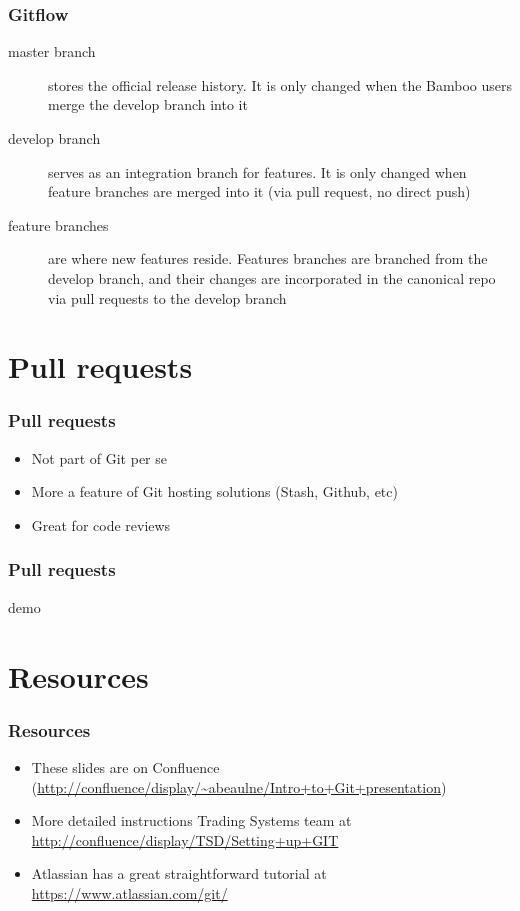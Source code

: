 \documentclass{beamer}
\begin{document}
\begin{frame}
    \frametitle{Gitflow}
    \begin{description}
      \item[master branch] stores the official release history. It is only changed when the Bamboo
          users merge the develop branch into it
      \item[develop branch] serves as an integration branch for features. It is only changed when
          feature branches are merged into it (via pull request, no direct push)
      \item[feature branches] are where new features reside. Features branches are branched from
          the develop branch, and their changes are incorporated in the canonical repo via pull
          requests to the develop branch
    \end{description}
\end{frame}

\section{Pull requests}

\begin{frame}
    \frametitle{Pull requests}
    \begin{itemize}
        \item Not part of Git per se
        \item More a feature of Git hosting solutions (Stash, Github, etc)
        \item Great for code reviews
    \end{itemize}
\end{frame}

\begin{frame}
    \frametitle{Pull requests}
    demo
\end{frame}

\section{Resources}

\begin{frame}
    \frametitle{Resources}
    \begin{itemize}
        \item These slides are on Confluence (\url{http://confluence/display/~abeaulne/Intro+to+Git+presentation})
        \item More detailed instructions Trading Systems team at \url{http://confluence/display/TSD/Setting+up+GIT}
        \item Atlassian has a great straightforward tutorial at \url{https://www.atlassian.com/git/}
    \end{itemize}
\end{frame}
\end{document}
